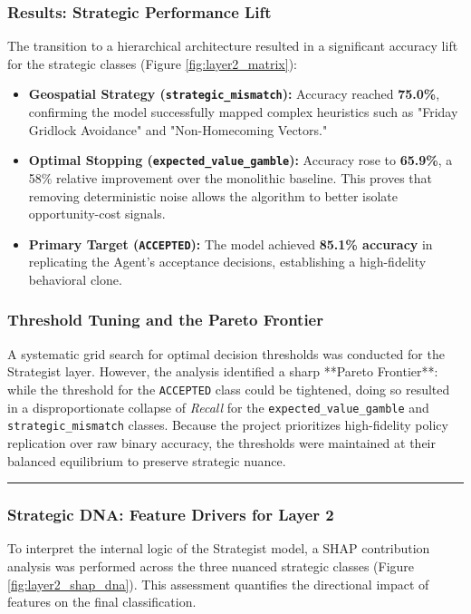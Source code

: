 \subsubsection{Results: Strategic Performance Lift}
The transition to a hierarchical architecture resulted in a significant accuracy lift for the strategic classes (Figure \ref{fig:layer2_matrix}):

\begin{itemize}[noitemsep, topsep=3pt]
    \item \textbf{Geospatial Strategy (\texttt{strategic\_mismatch}):} Accuracy reached \textbf{75.0\%}, confirming the model successfully mapped complex heuristics such as "Friday Gridlock Avoidance" and "Non-Homecoming Vectors."
    \item \textbf{Optimal Stopping (\texttt{expected\_value\_gamble}):} Accuracy rose to \textbf{65.9\%}, a 58\% relative improvement over the monolithic baseline. This proves that removing deterministic noise allows the algorithm to better isolate opportunity-cost signals.
    \item \textbf{Primary Target (\texttt{ACCEPTED}):} The model achieved \textbf{85.1\% accuracy} in replicating the Agent’s acceptance decisions, establishing a high-fidelity behavioral clone.
\end{itemize}

\subsubsection{Threshold Tuning and the Pareto Frontier}
A systematic grid search for optimal decision thresholds was conducted for the Strategist layer. However, the analysis identified a sharp **Pareto Frontier**: while the threshold for the \texttt{ACCEPTED} class could be tightened, doing so resulted in a disproportionate collapse of \textit{Recall} for the \texttt{expected\_value\_gamble} and \texttt{strategic\_mismatch} classes. Because the project prioritizes high-fidelity policy replication over raw binary accuracy, the thresholds were maintained at their balanced equilibrium to preserve strategic nuance.



\vspace{0.4cm}
\rule{\linewidth}{0.4pt}


\subsubsection{Strategic DNA: Feature Drivers for Layer 2}
To interpret the internal logic of the Strategist model, a SHAP contribution analysis was performed across the three nuanced strategic classes (Figure \ref{fig:layer2_shap_dna}). This assessment quantifies the directional impact of features on the final classification.

